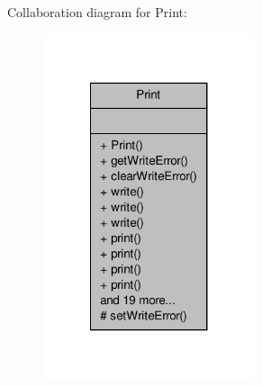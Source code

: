 Collaboration diagram for Print\-:
\nopagebreak
\begin{figure}[H]
\begin{center}
\leavevmode
\includegraphics[width=176pt]{class_print__coll__graph}
\end{center}
\end{figure}

